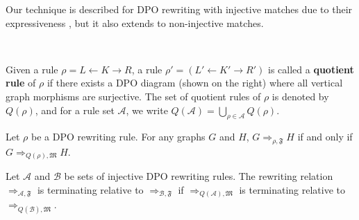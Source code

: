 \noindent Our technique is described for DPO rewriting with injective matches due to their expressiveness \cite{habel2001double}, but it also extends to non-injective matches.

\begin{definition} 
    \ \newline 
    \noindent
    \begin{minipage}{0.7\textwidth}
        Given a rule $\rho = L \leftarrow K \rightarrow R$, a rule $\rho' = (L' \leftarrow K' \rightarrow R')$ is called a \textbf{quotient rule} of $\rho$ if there exists a DPO diagram (shown on the right)
    where all vertical graph morphisms are surjective. The set of quotient rules of $\rho$ is denoted by $Q(\rho)$, and 
    for a rule set $\mathcal{A}$, we write $Q(\mathcal{A}) = \bigcup_{\rho\in\mathcal{A}} Q(\rho)$.
    \end{minipage}
    \hfill
    \begin{minipage}{0.29\textwidth}
        \hfill
    \end{minipage}
\end{definition}

\begin{lemma}
    Let $\rho$ be a DPO rewriting rule. For any graphs $G$ and $H$,
    $G \Rightarrow_{\rho,\mathfrak{F}} H$ if and only if $G \Rightarrow_{Q(\rho),\mathfrak{M}} H$.
\end{lemma}
\begin{corollary}
    \label{cor:termination}
    Let \(\mathcal{A}\) and \(\mathcal{B}\) be sets of injective DPO rewriting rules. 
    The rewriting relation $\Rightarrow_{\mathcal{A},\mathfrak{F}}$ is terminating relative to $\Rightarrow_{\mathcal{B},\mathfrak{F}}$ 
    if 
    $\Rightarrow_{Q(\mathcal{A}),\mathfrak{M}}$ is terminating relative to $\Rightarrow_{Q(\mathcal{B}),\mathfrak{M}}$.
\end{corollary}
